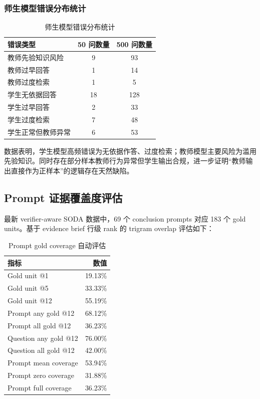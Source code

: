 \documentclass[UTF8,a4paper,12pt]{ctexart}
\begin{document}
\subsubsection{师生模型错误分布统计}

\begin{table}[htbp]
\centering
\small
\begin{tabular}{lcc}
\toprule
错误类型 & 50 问数量 & 500 问数量 \\
\midrule
教师先验知识风险 & 9 & 93 \\
教师过早回答 & 1 & 14 \\
教师过度检索 & 1 & 5 \\
学生无依据回答 & 18 & 128 \\
学生过早回答 & 2 & 33 \\
学生过度检索 & 7 & 48 \\
学生正常但教师异常 & 6 & 53 \\
\bottomrule
\end{tabular}
\caption{师生模型错误分布统计}
\end{table}

数据表明，学生模型高频错误为无依据作答、过度检索；教师模型主要风险为滥用先验知识。同时存在部分样本教师行为异常但学生输出合规，进一步证明“教师输出直接作为正样本”的逻辑存在天然缺陷。

\subsection{Prompt 证据覆盖度评估}

最新 verifier-aware SODA 数据中，69 个 conclusion prompts 对应 183 个 gold units。基于 evidence brief 行级 rank 的 trigram overlap 评估如下：

\begin{table}[htbp]
\centering
\begin{tabular}{lr}
\toprule
指标 & 数值 \\
\midrule
Gold unit @1 & 19.13\% \\
Gold unit @5 & 33.33\% \\
Gold unit @12 & 55.19\% \\
Prompt any gold @12 & 68.12\% \\
Prompt all gold @12 & 36.23\% \\
Question any gold @12 & 76.00\% \\
Question all gold @12 & 42.00\% \\
Prompt mean coverage & 53.94\% \\
Prompt zero coverage & 31.88\% \\
Prompt full coverage & 36.23\% \\
\bottomrule
\end{tabular}
\caption{Prompt gold coverage 自动评估}
\end{table}
\end{document}
